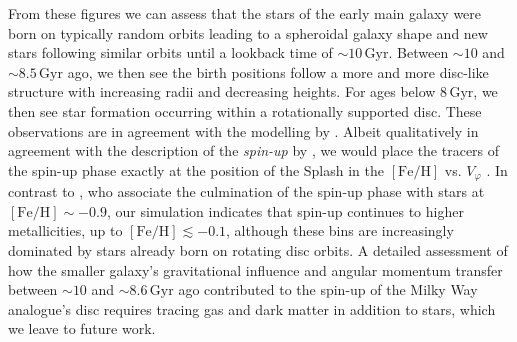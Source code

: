 \documentclass[fleqn,usenatbib]{mnras}
\begin{document}
From these figures we can assess that the stars of the early main galaxy were born on typically random orbits leading to a spheroidal galaxy shape and new stars following similar orbits until a lookback time of $\sim 10\,\mathrm{Gyr}$. Between $\sim10$ and $\sim 8.5\,\mathrm{Gyr}$ ago, we then see the birth positions follow a more and more disc-like structure with increasing radii and decreasing heights. For ages below $8\,\mathrm{Gyr}$, we then see star formation occurring within a rotationally supported disc. These observations are in agreement with the modelling by \citet{MCM2013}. 
Albeit qualitatively in agreement with the description of the \textit{spin-up} by \citet{Belokurov2022}, we would place the tracers of the spin-up phase exactly at the position of the Splash in the $\mathrm{[Fe/H]}$ vs. $V_\varphi$ \citep[see also][]{Viswanathan2025b}. In contrast to \citet[][their Fig.~5b]{Belokurov2022}, who associate the culmination of the spin-up phase with stars at $\mathrm{[Fe/H]} \sim -0.9$, our simulation indicates that spin-up continues to higher metallicities, up to $\mathrm{[Fe/H]} \lesssim -0.1$, although these bins are increasingly dominated by stars already born on rotating disc orbits. A detailed assessment of how the smaller galaxy’s gravitational influence and angular momentum transfer between $\sim10$ and $\sim8.6\,\mathrm{Gyr}$ ago contributed to the spin-up of the Milky Way analogue’s disc requires tracing gas and dark matter in addition to stars, which we leave to future work.
\end{document}
